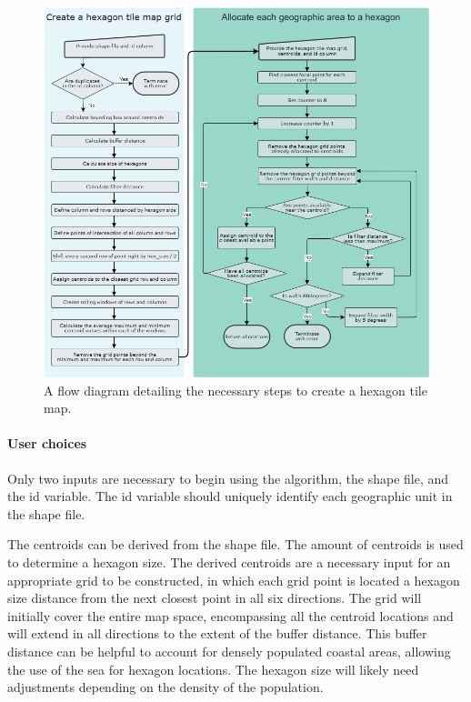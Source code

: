 \begin{figure}
\includegraphics[width=14cm]{figs/sugarbag flow.png}
\caption{\label{fig:sugarbag_flow}A flow diagram detailing the necessary steps to create a hexagon tile map.}
\end{figure}

\hypertarget{user-choices}{%
\paragraph{User choices}\label{user-choices}}

Only two inputs are necessary to begin using the algorithm, the shape
file, and the id variable. The id variable should uniquely identify each
geographic unit in the shape file.

The centroids can be derived from the shape file. The amount of
centroids is used to determine a hexagon size. The derived centroids are
a necessary input for an appropriate grid to be constructed, in which
each grid point is located a hexagon size distance from the next closest
point in all six directions. The grid will initially cover the entire
map space, encompassing all the centroid locations and will extend in
all directions to the extent of the buffer distance. This buffer
distance can be helpful to account for densely populated coastal areas,
allowing the use of the sea for hexagon locations. The hexagon size will
likely need adjustments depending on the density of the population.

